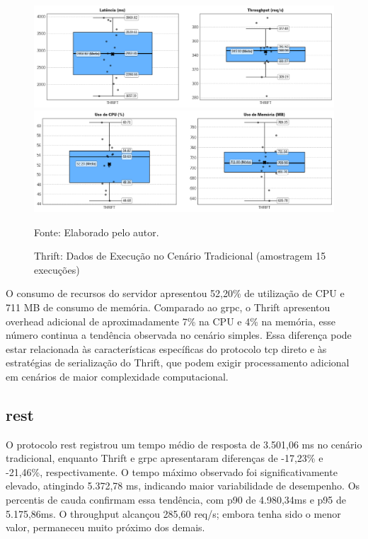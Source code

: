 \begin{figure}[H]
    \caption{Thrift: Dados de Execução no Cenário Tradicional (amostragem 15 execuções)}
    \label{fig:5-Tradicional-Thrift-k6}
    \centering
    \includegraphics[width=1\linewidth]{imagens//resultados/5-resultados-Tradicional-Thrift-k6.png}
    \includegraphics[width=1\linewidth]{imagens//resultados/5-resultados-Tradicional-Thrift-prometheus.png}    
    {\par \raggedright \footnotesize Fonte: Elaborado pelo autor.\par}
\end{figure}

O consumo de recursos do servidor apresentou 52,20\% de utilização de CPU e 711 MB de consumo de memória. Comparado ao \gls{grpc}, o Thrift apresentou overhead adicional de aproximadamente 7\% na CPU e 4\% na memória, esse número continua a tendência observada no cenário simples. Essa diferença pode estar relacionada às características específicas do protocolo \acrshort{tcp} direto e às estratégias de serialização do Thrift, que podem exigir processamento adicional em cenários de maior complexidade computacional.

\subsection{\gls{rest}}

O protocolo \gls{rest} registrou um tempo médio de resposta de 3.501,06 ms no cenário tradicional, enquanto Thrift e \acrshort{grpc} apresentaram diferenças de -17,23\% e -21,46\%, respectivamente. O tempo máximo observado foi significativamente elevado, atingindo 5.372,78 ms, indicando maior variabilidade de desempenho. Os percentis de cauda confirmam essa tendência, com p90 de 4.980,34ms e p95 de 5.175,86ms. O throughput alcançou 285,60 req/s; embora tenha sido o menor valor, permaneceu muito próximo dos demais.

